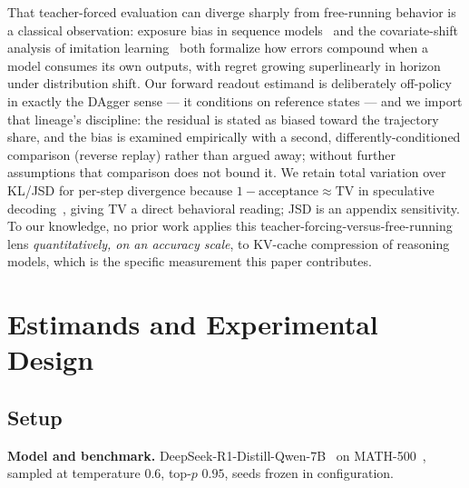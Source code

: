 \documentclass{article}
\newcommand{\TV}{\mathrm{TV}}
\begin{document}
That teacher-forced evaluation can diverge sharply from free-running behavior is a classical observation: exposure bias in sequence models~\citep{ranzato2016exposure,bengio2015scheduled} and the covariate-shift analysis of imitation learning~\citep{ross2011dagger} both formalize how errors compound when a model consumes its own outputs, with regret growing superlinearly in horizon under distribution shift. Our forward readout estimand is deliberately off-policy in exactly the DAgger sense --- it conditions on reference states --- and we import that lineage's discipline: the residual is stated as biased toward the trajectory share, and the bias is examined empirically with a second, differently-conditioned comparison (reverse replay) rather than argued away; without further assumptions that comparison does not bound it. We retain total variation over KL/JSD for per-step divergence because $1 - \text{acceptance} \approx \TV$ in speculative decoding~\citep{leviathan2023speculative}, giving TV a direct behavioral reading; JSD is an appendix sensitivity. To our knowledge, no prior work applies this teacher-forcing-versus-free-running lens \emph{quantitatively, on an accuracy scale}, to KV-cache compression of reasoning models, which is the specific measurement this paper contributes.

\section{Estimands and Experimental Design}
\label{sec:estimands}

\subsection{Setup}
\label{sec:setup}
\textbf{Model and benchmark.} DeepSeek-R1-Distill-Qwen-7B~\citep{deepseek2025r1} on MATH-500~\citep{hendrycks2021math,lightman2023verify}, sampled at temperature $0.6$, top-$p$ $0.95$, seeds frozen in configuration.
\end{document}
